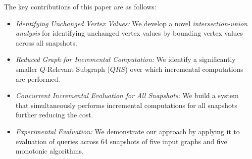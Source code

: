 \vspace{0.05in}
\noindent
The key contributions of this paper are as follows:
\begin{itemize}[leftmargin=*, topsep=1pt]
\setlength{\itemsep}{0.5pt}
\setlength{\parskip}{0.5pt}
    \item
    \textsf{\it Identifying Unchanged Vertex Values:} We 
    develop a novel \emph{intersection-union analysis} for identifying unchanged vertex values by bounding vertex values across all snapshots. 
    
    \item
    \textsf{\it Reduced Graph for Incremental Computation:} We identify a significantly smaller $Q$-Relevant Subgraph ($QRS$) over which incremental computations are performed.
    
    \item
    \textsf{\it Concurrent Incremental Evaluation for All Snapshots:} We build a system that simultaneously performs incremental computations for all snapshots further reducing the cost. 

    \item 
    \textsf{\it Experimental Evaluation:} We demonstrate our approach by applying it to evaluation of queries across 64 snapshots of five input graphs and five monotonic algorithms.  
\end{itemize}